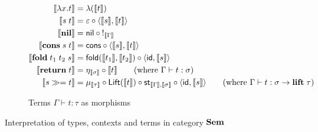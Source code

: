 \begin{figure}
\begin{subfigure}{\linewidth}
\begin{align*}
  \\
  \sem{\tmFun{x}{t}} &= \lambda(\sem{t})
  \\
  \sem{\tmApp{s}{t}} &= \eval \comp \prodM{\sem{s}}{\sem{t}}
  \\
  \sem{\tmNil} &= \nil \comp {!_{\sem{\Gamma}}}
  \\
  \sem{\tmCons{s}{t}} &= \cons \comp \prodM{\sem{s}}{\sem{t}}
  \\
  \sem{\tmFoldList{t_1}{t_2}{s}} &= \fold(\sem{t_1},\sem{t_2}) \comp \prodM{\id}{\sem{s}}
  \\
  \sem{\tmReturn{t}} &= \eta_{\sem{\sigma}} \comp \sem{t}
  \tag*{\text{(where $\Gamma \vdash t: \sigma$)}}
  \\
  \sem{\tmBind{s}{t}} &= \mu_{\sem{\tau}} \comp \Lift(\sem{t}) \comp \mathsf{st}_{\sem{\Gamma},\sem{\sigma}} \comp \prodM{\id}{\sem{s}}
  \tag*{\text{(where $\Gamma \vdash t: \sigma \to \tyLift\;\tau$)}}
  \end{align*}
  \caption{Terms $\Gamma \vdash t: \tau$ as morphisms}
  \label{fig:semantics:terms}
\end{subfigure}
\caption{Interpretation of types, contexts and terms in category $\mathbf{Sem}$}
\end{figure}
